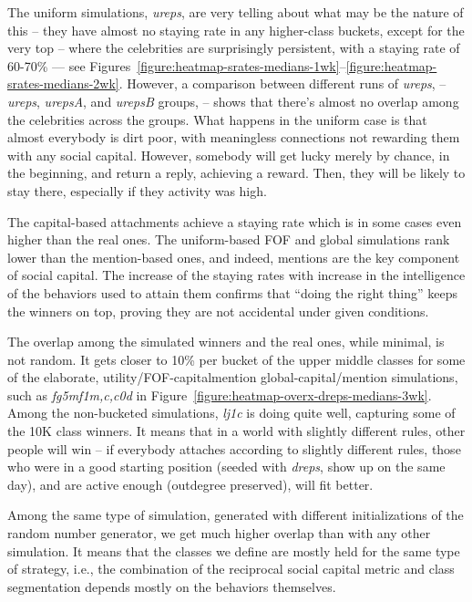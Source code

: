 \documentclass[10pt,oneside]{memoir}
\begin{document}
\begin{Spacing}{2}
The uniform simulations, {\itshape ureps}, are very telling about what may be the nature of this -- they have almost no staying rate in any higher-class buckets, except for the very top -- where the celebrities are surprisingly persistent, with a staying rate of 60-70\% --- see  Figures~\ref{figure:heatmap-srates-medians-1wk}--\ref{figure:heatmap-srates-medians-2wk}.   However, a comparison between different runs of {\itshape ureps}, -- {\itshape ureps}, {\itshape urepsA}, and {\itshape urepsB} groups, -- shows that there's almost no overlap among the celebrities across the groups.  What happens in the uniform case is that almost everybody is dirt poor, with meaningless connections not rewarding them with any social capital.  However, somebody will get lucky merely by chance, in the beginning, and return a reply, achieving a reward.  Then, they will be likely to stay there, especially if they activity was high.


The capital-based attachments achieve a staying rate which is in some cases even higher than the real ones.  The uniform-based FOF and global simulations rank lower than the mention-based ones, and indeed, mentions are the key component of social capital.  The increase of the staying rates with increase in the intelligence of the behaviors used to attain them confirms that ``doing the right thing'' keeps the winners on top, proving they are not accidental under given conditions.


The overlap among the simulated winners and the real ones, while minimal, is not random.  It gets closer to 10\% per bucket of the upper middle classes for some of the elaborate, utility/FOF-capitalmention global-capital/mention simulations, such as {\itshape fg5mf1{m,c,c0d}} in Figure~\ref{figure:heatmap-overx-dreps-medians-3wk}.  Among the non-bucketed simulations, {\itshape lj1c} is doing quite well, capturing some of the 10K class winners.   It means that in a world with slightly different rules, other people will win -- if everybody attaches according to slightly different rules, those who were in a good starting position (seeded with {\itshape dreps}, show up on the same day), and are active enough (outdegree preserved), will fit better.


Among the same type of simulation, generated with different initializations of the random number generator, we get much higher overlap than with any other simulation.  It means that the classes we define are mostly held for the same type of strategy, i.e., the combination of the reciprocal social capital metric and class segmentation depends mostly on the behaviors themselves.



\end{Spacing}
\end{document}
